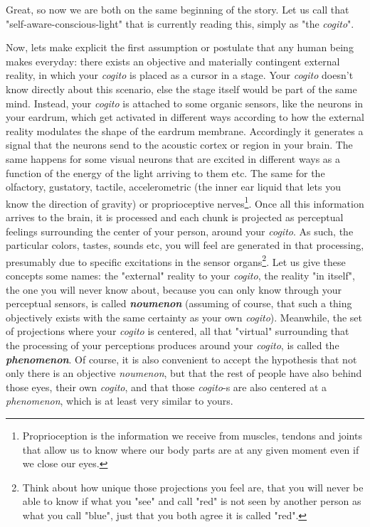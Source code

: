 \documentclass[11pt, a4paper]{article} %
\begin{document}
Great, so now we are both on the same beginning of the story. Let us call that "self-aware-conscious-light" that is currently reading this, simply as "the {\em cogito}".

Now, lets make explicit the first assumption or postulate that any human being makes everyday: there exists an objective and materially contingent external reality, in which your {\em cogito} is placed as a cursor in a stage. Your {\em cogito} doesn't know directly about this scenario, else the stage itself would be part of the same mind. Instead, your {\em cogito} is attached to some organic sensors, like the neurons in your eardrum, which get activated in different ways according to how the external reality modulates the shape of the eardrum membrane. Accordingly it generates a signal that the neurons send to the acoustic cortex or region in your brain. The same happens for some visual neurons that are excited in different ways as a function of the energy of the light arriving to them etc. The same for the olfactory, gustatory, tactile, accelerometric (the inner ear liquid that lets you know the direction of gravity) or proprioceptive nerves\footnote{Proprioception is the information we receive from muscles, tendons and joints that allow us to know where our body parts are at any given moment even if we close our eyes.}. Once all this information arrives to the brain, it is processed and each chunk is projected as perceptual feelings surrounding the center of your person, around your {\em cogito}. As such, the particular colors, tastes, sounds etc, you will feel are generated in that processing, presumably due to specific excitations in the sensor organs\footnote{Think about how unique those projections you feel are, that you will never be able to know if what you "see" and call "red" is not seen by another person as what you call "blue", just that you both agree it is called "red".}. Let us give these concepts some names: the "external" reality to your {\em cogito}, the reality "in itself", the one you will never know about, because you can only know through your perceptual sensors, is called {\em \bf noumenon} (assuming of course, that such a thing objectively exists with the same certainty as your own {\em cogito}). Meanwhile, the set of projections where your {\em cogito} is centered, all that "virtual" surrounding that the processing of your perceptions produces around your {\em cogito}, is called the {\em \bf phenomenon}. Of course, it is also convenient to accept the hypothesis that not only there is an objective {\em noumenon}, but that the rest of people have also behind those eyes, their own {\em cogito}, and that those {\em cogito}-s are also centered at a {\em phenomenon}, which is at least very similar to yours.
\end{document}
